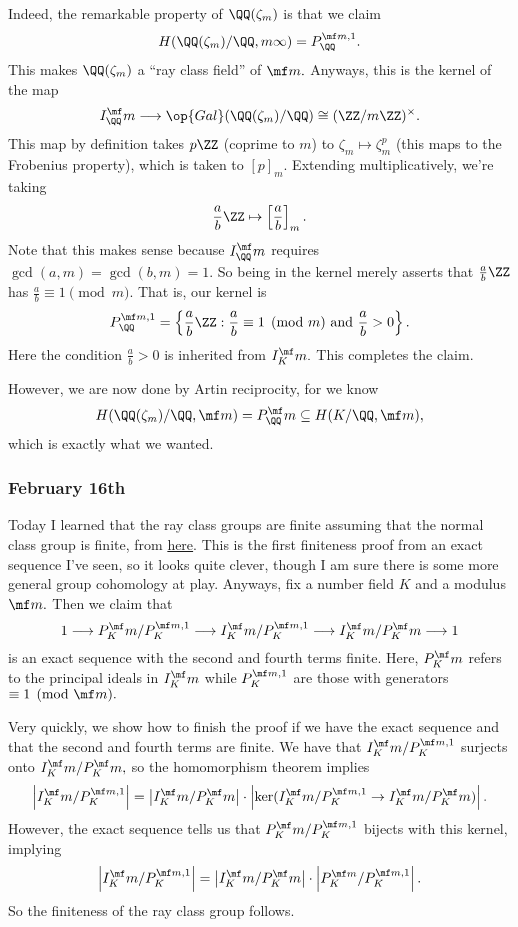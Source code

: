 Indeed, the remarkable property of $\QQ(\zeta_m)$ is that we claim
\[H(\QQ(\zeta_m)/\QQ,m\infty)=P_\QQ^{\mf m,1}.\]
This makes $\QQ(\zeta_m)$ a ``ray class field'' of $\mf m.$ Anyways, this is the kernel of the map
\[I_\QQ^\mf m\longrightarrow\op{Gal}(\QQ(\zeta_m)/\QQ)\cong(\ZZ/m\ZZ)^\times.\]
This map by definition takes $p\ZZ$ (coprime to $m$) to $\zeta_m\mapsto\zeta_m^p$ (this maps to the Frobenius property), which is taken to $[p]_m.$ Extending multiplicatively, we're taking
\[\frac ab\ZZ\mapsto\left[\frac ab\right]_m.\]
Note that this makes sense because $I_\QQ^\mf m$ requires $\gcd(a,m)=\gcd(b,m)=1.$ So being in the kernel merely asserts that $\frac ab\ZZ$ has $\frac ab\equiv1\pmod m.$ That is, our kernel is
\[P_\QQ^{\mf m,1}=\left\{\frac ab\ZZ:\frac ab\equiv1\pmod m\text{ and }\frac ab>0\right\}.\]
Here the condition $\frac ab>0$ is inherited from $I_K^\mf m.$ This completes the claim.

However, we are now done by Artin reciprocity, for we know
\[H(\QQ(\zeta_m)/\QQ,\mf m)=P_\QQ^\mf m\subseteq H(K/\QQ,\mf m),\]
which is exactly what we wanted.

\subsubsection{February 16th}
Today I learned that the ray class groups are finite assuming that the normal class group is finite, from \href{https://math.stackexchange.com/questions/74206/ray-class-group}{here}. This is the first finiteness proof from an exact sequence I've seen, so it looks quite clever, though I am sure there is some more general group cohomology at play. Anyways, fix a number field $K$ and a modulus $\mf m.$ Then we claim that
\[1\longrightarrow P_K^\mf m/P_K^{\mf m,1}\longrightarrow I_K^\mf m/P_K^{\mf m,1}\longrightarrow I_K^\mf m/P_K^\mf m\longrightarrow1\]
is an exact sequence with the second and fourth terms finite. Here, $P_K^\mf m$ refers to the principal ideals in $I_K^\mf m$ while $P_K^{\mf m,1}$ are those with generators $\equiv1\pmod{\mf m}.$

Very quickly, we show how to finish the proof if we have the exact sequence and that the second and fourth terms are finite. We have that $I_K^\mf m/P_K^{\mf m,1}$ surjects onto $I_K^\mf m/P_K^\mf m,$ so the homomorphism theorem implies
\[\left|I_K^\mf m/P_K^{\mf m,1}\right|=\left|I_K^\mf m/P_K^\mf m\right|\cdot\left|\ker(I_K^\mf m/P_K^{\mf m,1}\to I_K^\mf m/P_K^\mf m)\right|.\]
However, the exact sequence tells us that $P_K^\mf m/P_K^{\mf m,1}$ bijects with this kernel, implying
\[\left|I_K^\mf m/P_K^{\mf m,1}\right|=\left|I_K^\mf m/P_K^\mf m\right|\cdot\left|P_K^{\mf m}/P_K^{\mf m,1}\right|.\]
So the finiteness of the ray class group follows.

